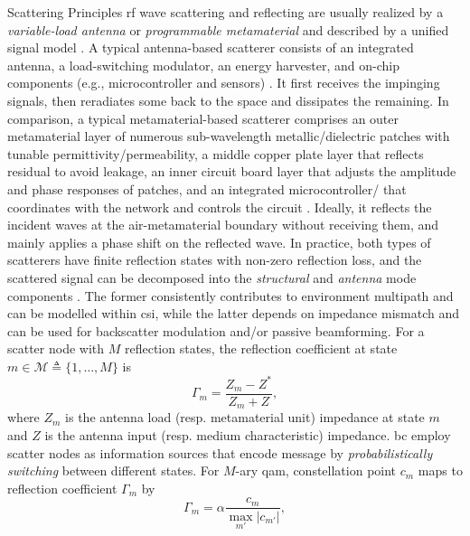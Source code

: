 \documentclass[journal]{IEEEtran}
\begin{document}
\begin{section}{Scattering Principles}
	\gls{rf} wave scattering and reflecting are usually realized by a \emph{variable-load antenna} or \emph{programmable metamaterial} and described by a unified signal model \cite{Liang2022}.
	A typical antenna-based scatterer consists of an integrated antenna, a load-switching modulator, an energy harvester, and on-chip components (e.g., microcontroller and sensors) \cite{Dobkin2012}.
	It first receives the impinging signals, then reradiates some back to the space and dissipates the remaining.
	In comparison, a typical metamaterial-based scatterer comprises an outer metamaterial layer of numerous sub-wavelength metallic/dielectric patches with tunable permittivity/permeability, a middle copper plate layer that reflects residual to avoid leakage, an inner circuit board layer that adjusts the amplitude and phase responses of patches, and an integrated microcontroller/ that coordinates with the network and controls the circuit \cite{Wu2020}.
	Ideally, it reflects the incident waves at the air-metamaterial boundary without receiving them, and mainly applies a phase shift on the reflected wave.
	In practice, both types of scatterers have finite reflection states with non-zero reflection loss, and the scattered signal can be decomposed into the \emph{structural} and \emph{antenna} mode components \cite{Hansen1989}.
	The former consistently contributes to environment multipath and can be modelled within \gls{csi}, while the latter depends on impedance mismatch and can be used for backscatter modulation and/or passive beamforming.
	For a scatter node with $M$ reflection states, the reflection coefficient at state $m \in \mathcal{M} \triangleq \{1,\ldots,M\}$ is
	\begin{equation}
		\Gamma_m = \frac{Z_m - Z^*}{Z_m + Z},
		\label{eq:reflection_coefficient}
	\end{equation}
	where $Z_m$ is the antenna load (resp. metamaterial unit) impedance at state $m$ and $Z$ is the antenna input (resp. medium characteristic) impedance.
	\gls{bc} employ scatter nodes as information sources that encode message by \emph{probabilistically switching} between different states.
	For $M$-ary \gls{qam}, constellation point $c_m$ maps to reflection coefficient $\Gamma_m$ by \cite{Thomas2012a}
	\begin{equation}
		\Gamma_m = \alpha \frac{c_m}{\max_{m'} \lvert c_{m'} \rvert},

\end{equation}
\end{section}
\end{document}
